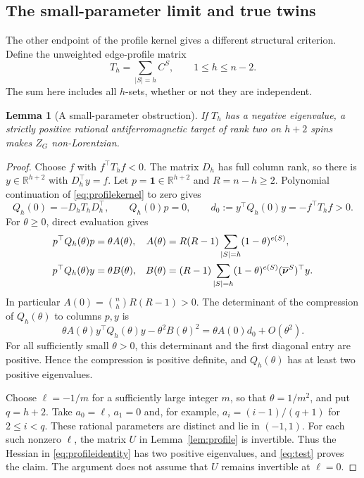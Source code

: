 \documentclass[11pt]{article}
\newtheorem{lemma}[theorem]{Lemma}
\theoremstyle{remark}
\newcommand{\R}{\mathbb R}
\newcommand{\one}{\mathbf 1}
\newcommand{\bnu}{\boldsymbol{\nu}}
\begin{document}
\subsection{The small-parameter limit and true twins}
The other endpoint of the profile kernel gives a different structural
criterion. Define the unweighted edge-profile matrix
\begin{equation}
 T_h=\sum_{|S|=h}C^S,\qquad 1\leq h\leq n-2.
 \label{eq:unweightedprofile}
\end{equation}
The sum here includes all $h$-sets, whether or not they are independent.

\begin{lemma}[A small-parameter obstruction]\label{lem:smallparameter}
If $T_h$ has a negative eigenvalue, a strictly positive rational
antiferromagnetic target of rank two on $h+2$ spins makes $Z_G$
non-Lorentzian.
\end{lemma}
\begin{proof}
Choose $f$ with $f^\top T_hf<0$. The matrix $D_h$ has full column
rank, so there is $y\in\R^{h+2}$ with $D_h^\top y=f$. Let
$p=\one\in\R^{h+2}$ and $R=n-h\geq2$. Polynomial continuation
of \eqref{eq:profilekernel} to zero gives
\[
 Q_h(0)=-D_hT_hD_h^\top,\qquad Q_h(0)p=0,\qquad
 d_0:=y^\top Q_h(0)y=-f^\top T_hf>0.
\]
For $\theta\geq0$, direct evaluation gives
\begin{align}
 p^\top Q_h(\theta)p&=\theta A(\theta),&
 A(\theta)&=R(R-1)\sum_{|S|=h}(1-\theta)^{e(S)},\notag\\
 p^\top Q_h(\theta)y&=\theta B(\theta),&
 B(\theta)&=(R-1)\sum_{|S|=h}(1-\theta)^{e(S)}
                         (\overline{\bnu}^S)^\top y.
 \label{eq:smallcompression}
\end{align}
In particular $A(0)=\binom nhR(R-1)>0$. The determinant of the
compression of $Q_h(\theta)$ to columns $p,y$ is
\[
 \theta A(\theta)y^\top Q_h(\theta)y-\theta^2 B(\theta)^2
   =\theta A(0)d_0+O(\theta^2).
\]
For all sufficiently small $\theta>0$, this determinant and the first
diagonal entry are positive. Hence the compression is positive definite,
and $Q_h(\theta)$ has at least two positive eigenvalues.

Choose $\ell=-1/m$ for a sufficiently large integer $m$, so that
$\theta=1/m^2$, and put $q=h+2$. Take $a_0=\ell$, $a_1=0$ and,
for example, $a_i=(i-1)/(q+1)$ for $2\leq i<q$. These rational
parameters are distinct and lie in $(-1,1)$. For each such nonzero
$\ell$, the matrix $U$ in Lemma~\ref{lem:profile} is invertible.
Thus the Hessian in \eqref{eq:profileidentity} has two positive
eigenvalues, and \eqref{eq:test} proves the claim. The argument does
not assume that $U$ remains invertible at $\ell=0$.
\end{proof}
\end{document}
